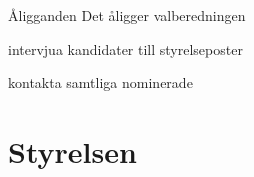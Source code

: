 \documentclass[pdfbookmarks,a4paper,11pt]{article}
\newlength{\itemcollength}
\newenvironment{reglemlista}{%
  \begin{list}{}{%
      \setlength{\labelwidth}{\itemcollength}%
      \setlength{\leftmargin}{\labelwidth + \labelsep}%
      \renewcommand{\makelabel}[1]{%
        \raisebox{0pt}[1ex][0pt]{%
          \makebox[\labelwidth][l]{%
            \parbox[t]{\itemcollength}{%
              \raggedright\hspace{0pt}##1}}}\hfill}%
      }}{%
  \end{list}}
\begin{document}
\begin{reglemlista}

  \item[Åligganden]
    Det åligger valberedningen
    \begin{attlista}
      \item intervjua kandidater till styrelseposter
      \item kontakta samtliga nominerade
    \end{attlista}

\end{reglemlista}

\section{Styrelsen}
\end{document}
